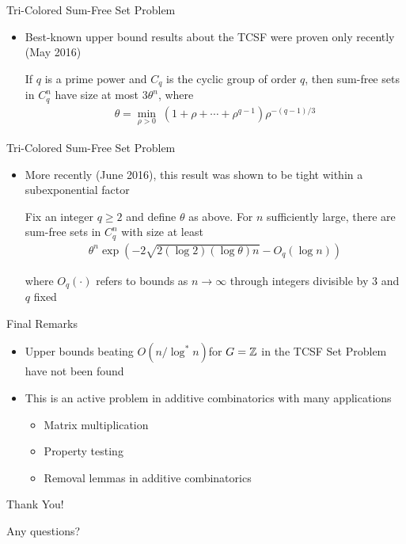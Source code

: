 \begin{frame}{Tri-Colored Sum-Free Set Problem}
\begin{itemize}
	\item Best-known upper bound results about the TCSF were proven only recently (May 2016)
	{
	\begin{theorem}
		If $q$ is a prime power and $C_q$ is the cyclic group of order $q$, then sum-free sets in $C_q^n$ have size at most $3\theta^n$, where
		\begin{align*}
			\theta = \underset{\rho > 0}{\min}\; (1 + \rho + \cdots + \rho^{q-1})\rho^{-(q-1)/3}
		\end{align*}
	\end{theorem}}
\end{itemize}
\end{frame}

\begin{frame}{Tri-Colored Sum-Free Set Problem}
\begin{itemize}
	\item More recently (June 2016), this result was shown to be tight within a subexponential factor
	{
	\begin{theorem}
		Fix an integer $q \geq 2$ and define $\theta$ as above. For $n$ sufficiently large, there are sum-free sets in $C_q^n$ with size at least
		\begin{align*}
		\theta^n \exp\left( -2 \sqrt{2(\log 2)(\log \theta)n} - O_q(\log n) \right)
		\end{align*}
	\end{theorem}}
	where $O_q(\cdot)$ refers to bounds as $n \rightarrow \infty$ through integers divisible by $3$ and $q$ fixed
\end{itemize}
\end{frame}

\begin{frame}{Final Remarks}
\begin{itemize}
	\item<1-> Upper bounds beating $O(n / \log^* n)$for $G = {\mathbb Z}$ in the TCSF Set Problem have not been found
	\item<2-> This is an active problem in additive combinatorics with many applications
	\begin{itemize}
		\item<3-> Matrix multiplication \cite{KSS16}
		\item<3-> Property testing \cite{BX15}
		\item<3-> Removal lemmas in additive combinatorics \cite{Green05}
	\end{itemize}
\end{itemize}
\end{frame}

\begin{frame}{Thank You!}
\centering

Any questions?
\end{frame}




